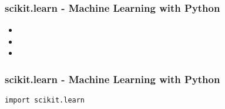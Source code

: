 \documentclass{beamer}
\begin{document}
\begin{frame}[fragile]
\frametitle{scikit.learn - Machine Learning with Python}
\LARGE
\begin{itemize}
\item
\item
\item
\end{itemize}
	
\end{frame}





\begin{frame}[fragile]
\frametitle{scikit.learn - Machine Learning with Python}
\LARGE	
\begin{framed}
\begin{verbatim}
import scikit.learn
\end{verbatim}
\end{framed}
\end{frame}
\end{document}
